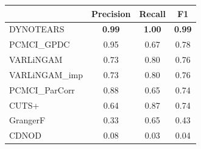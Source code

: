 \begin{tabular}{lccc}
\toprule
 & Precision & Recall & F1 \\
\midrule
DYNOTEARS & \textbf{0.99} & \textbf{1.00} & \textbf{0.99} \\
PCMCI\_GPDC & 0.95 & 0.67 & 0.78 \\
VARLiNGAM & 0.73 & 0.80 & 0.76 \\
VARLiNGAM\_imp & 0.73 & 0.80 & 0.76 \\
PCMCI\_ParCorr & 0.88 & 0.65 & 0.74 \\
CUTS+ & 0.64 & 0.87 & 0.74 \\
GrangerF & 0.33 & 0.65 & 0.43 \\
CDNOD & 0.08 & 0.03 & 0.04 \\
\bottomrule
\end{tabular}
